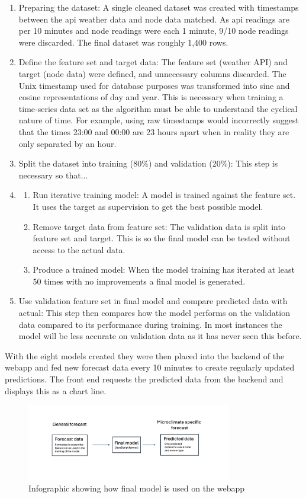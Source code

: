 \begin{enumerate}
    \item Preparing the dataset: A single cleaned dataset was created with
    timestamps between the api weather data and node data matched. As api
    readings are per 10 minutes and node readings were each 1 minute, 9/10 node
    readings were discarded. The final dataset was roughly 1,400 rows.
    \item Define the feature set and target data:  
    The feature set (weather API) and target (node data) were defined, and
    unnecessary columns discarded. The Unix timestamp used for database purposes
    was transformed into sine and cosine representations of day and year. This
    is necessary when training a time-series data set as the algorithm must be
    able to understand the cyclical nature of time.  
    For example, using raw timestamps would incorrectly suggest that the times
    23:00 and 00:00 are 23 hours apart when in reality they are only separated
    by an hour. 
    \item Split the dataset into training (80\%) and validation (20\%): This
    step is necessary so that...
    \item
        \begin{enumerate}
            \item Run iterative training model: A model is trained against the
            feature set. It uses the target as supervision to get the best
            possible model.
            \item Remove target data from feature set: The validation data is
            split into feature set and target. This is so the final model can be
            tested without access to the actual data.
            \item Produce a trained model: When the model training has iterated
            at least 50 times with no improvements a final model is generated.
        \end{enumerate}
    \item Use validation feature set in final model and compare predicted data
    with actual: This step then compares how the model performs on the
    validation data compared to its performance during training. In most
    instances the model will be less accurate on validation data as it has never
    seen this before.
\end{enumerate}

With the eight models created they were then placed into the backend of the
webapp and fed new forecast data every 10 minutes to create regularly updated
predictions. The front end requests the predicted data from the backend and
displays this as a chart line.

\begin{figure}[H]
    \centering
    \includegraphics[width=0.8\textwidth]{contents/part-3/fig3/model_diagram.png}
    \caption{Infographic showing how final model is used on the webapp}
    \label{fig:model_diagram}
\end{figure}
